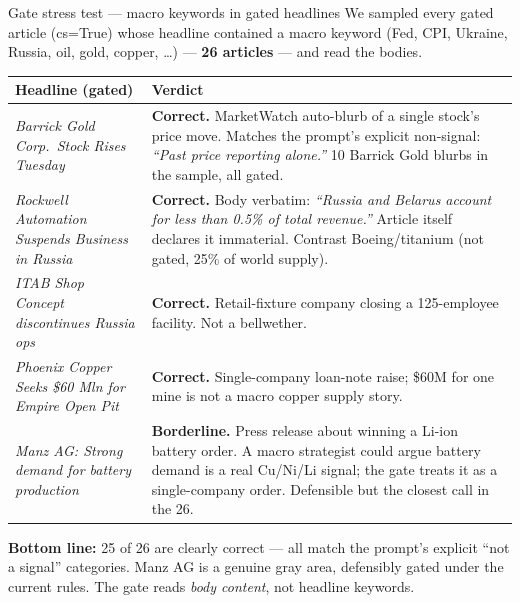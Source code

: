 \documentclass[10pt,aspectratio=169]{beamer}
\begin{document}
\begin{frame}{Gate stress test --- macro keywords in gated headlines}
  \scriptsize
  We sampled every gated article (cs=True) whose headline contained a macro keyword (Fed, CPI,
  Ukraine, Russia, oil, gold, copper, \ldots) --- \textbf{26 articles} --- and read the bodies.

  \vspace{0.4em}
  \setlength{\tabcolsep}{4pt}
  \renewcommand{\arraystretch}{1.1}
  \begin{tabular}{p{}p{}}
    \toprule
    \textbf{Headline (gated)} & \textbf{Verdict} \\
    \midrule
    \emph{Barrick Gold Corp.\ Stock Rises Tuesday} & \textcolor{goodgreen}{\textbf{Correct.}}
    MarketWatch auto-blurb of a single stock's price move. Matches the prompt's explicit
    non-signal: \emph{``Past price reporting alone.''} 10 Barrick Gold blurbs in the sample, all gated. \\
    \emph{Rockwell Automation Suspends Business in Russia} & \textcolor{goodgreen}{\textbf{Correct.}}
    Body verbatim: \emph{``Russia and Belarus account for less than 0.5\% of total revenue.''}
    Article itself declares it immaterial. Contrast Boeing/titanium (not gated, 25\% of world supply). \\
    \emph{ITAB Shop Concept discontinues Russia ops} & \textcolor{goodgreen}{\textbf{Correct.}}
    Retail-fixture company closing a 125-employee facility. Not a bellwether. \\
    \emph{Phoenix Copper Seeks \$60 Mln for Empire Open Pit} & \textcolor{goodgreen}{\textbf{Correct.}}
    Single-company loan-note raise; \$60M for one mine is not a macro copper supply story. \\
    \emph{Manz AG: Strong demand for battery production} & \textcolor{yellow!60!black}{\textbf{Borderline.}}
    Press release about winning a Li-ion battery order. A macro strategist could argue battery
    demand is a real Cu/Ni/Li signal; the gate treats it as a single-company order. Defensible
    but the closest call in the 26. \\
    \bottomrule
  \end{tabular}

  \vspace{0.4em}
  \textcolor{goodgreen}{\textbf{Bottom line:}} 25 of 26 are clearly correct --- all match the
  prompt's explicit ``not a signal'' categories. Manz AG is a genuine gray area, defensibly
  gated under the current rules. The gate reads \emph{body content}, not headline keywords.
\end{frame}
\end{document}
